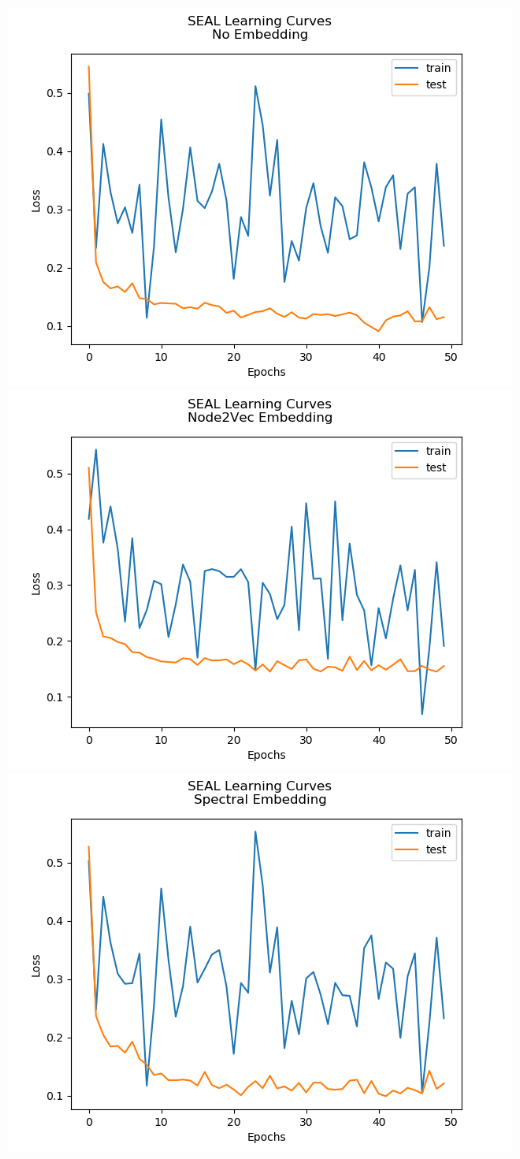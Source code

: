 \documentclass[10pt,twocolumn,letterpaper]{article}
\begin{document}
\begin{center}
\includegraphics[scale=0.35]{latex/images/No Embedding.png}
\includegraphics[scale=0.35]{latex/images/Node2Vec Embedding.png}
\includegraphics[scale=0.35]{latex/images/Spectral Embedding.png}

\end{center}
\end{document}
